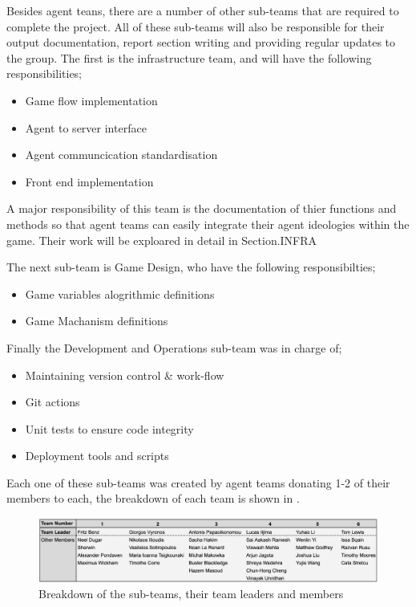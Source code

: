 Besides agent teans, there are a number of other sub-teams that are required to complete the project. All of these sub-teams will also be responsible for their output documentation, report section writing and providing regular updates to the group. 
The first is the infrastructure team, and will have the following responsibilities;

\begin{itemize}
    \item Game flow implementation
    \item Agent to server interface
    \item Agent communcication standardisation
    \item Front end implementation
\end{itemize}

A major responsibility of this team is the documentation of thier functions and methods so that agent teams can easily integrate their agent ideologies within the game. Their work will be exploared in detail in Section.INFRA

The next sub-team is Game Design, who have the following responsibilties;

\begin{itemize}
    \item Game variables alogrithmic definitions
    \item Game Machanism definitions 
\end{itemize}

Finally the Development and Operations sub-team was in charge of;

\begin{itemize}
    \item Maintaining version control \& work-flow
    \item Git actions
    \item Unit tests to ensure code integrity
    \item Deployment tools and scripts
\end{itemize}

Each one of these sub-teams was created by agent teams donating 1-2 of their members to each, the breakdown of each team is shown in .

\begin{figure}[htb]
    \centering
    \includegraphics{000_introduction/images/subteams.png}
    \caption{Breakdown of the sub-teams, their team leaders and members}
    \label{fig:subteams}
\end{figure}

